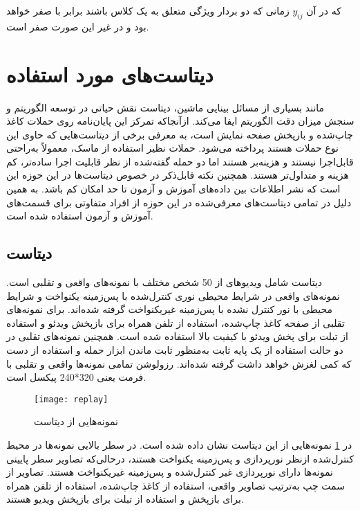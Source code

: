 که در آن 
$y_{ij}$
  زمانی که دو بردار ویژگی متعلق به یک کلاس باشند برابر با صفر خواهد بود و در غیر این صورت صفر است.
  \section{دیتاست‌های مورد استفاده}
  مانند بسیاری از مسائل بینایی ماشین، دیتاست نقش حیاتی در توسعه الگوریتم و سنجش میزان دقت الگوریتم ایفا می‌کند. از‌آنجا‌که تمرکز این پایان‌نامه روی حملات کاغذ چاپ‌شده و بازپخش صفحه نمایش است، به معرفی برخی از دیتاست‌هایی که حاوی این نوع حملات هستند پرداخته می‌شود. حملات نظیر استفاده از ماسک، معمولاً به‌راحتی قابل‌اجرا نیستند و هزینه‌بر هستند اما دو حمله گفته‌شده از نظر قابلیت اجرا ساده‌تر، کم هزینه و متداول‌تر هستند. همچنین نکته قابل‌ذکر در خصوص دیتاست‌ها در این حوزه این است که نشر اطلاعات بین داده‌های آموزش و آزمون تا حد امکان کم باشد. به همین دلیل در تمامی دیتاست‌های معرفی‌شده در این حوزه از افراد متفاوتی برای قسمت‌های آموزش و آزمون استفاده شده است.
\subsection{دیتاست }
دیتاست
 \cite{chingovska2012effectiveness}
شامل ویدیوهای از 50 شخص مختلف با نمونه‌های واقعی و تقلبی است. نمونه‌های واقعی در شرایط محیطی نوری کنترل‌شده با پس‌زمینه یکنواخت و شرایط محیطی با نور کنترل نشده با پس‌زمینه غیر‌یکنواخت گرفته شده‌اند. برای نمونه‌های تقلبی از صفحه کاغذ چاپ‌شده، استفاده از تلفن همراه برای بازپخش ویدئو و استفاده از تبلت  برای پخش ویدئو با کیفیت بالا استفاده شده است. همچنین نمونه‌های تقلبی در دو حالت استفاده از یک پایه ثابت به‌منظور ثابت ماندن ابزار حمله و استفاده از دست که کمی لغزش خواهد داشت گرفته شده‌اند. رزولوشن تمامی نمونه‌ها واقعی و تقلبی با فرمت  یعنی 320*240 پیکسل است.
\begin{figure}[h]
 	\centerline{\texttt{[image: replay]}}
 	\caption{نمونه‌هایی از دیتاست  \cite{chingovska2012effectiveness} }
 	\label{fig:replay}
\end{figure}
در
\ref{fig:replay}
نمونه‌هایی از این دیتاست نشان داده شده است. در سطر بالایی نمونه‌ها در محیط کنترل‌شده از‌نظر نورپردازی و پس‌زمینه یکنواخت هستند، در‌حالی‌که تصاویر سطر پایینی نمونه‌ها دارای نورپردازی غیر کنترل‌شده و پس‌زمینه غیر‌یکنواخت هستند. تصاویر از سمت چپ به‌ترتیب تصاویر واقعی، استفاده از کاغذ چاپ‌شده، استفاده از تلفن همراه برای بازپخش و استفاده از تبلت برای بازپخش ویدیو هستند.

